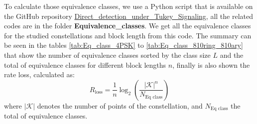 To calculate those equivalence classes, we use a Python script that is available on the GitHub repository \href{https://github.com/dfigueroa11/Direct_detection_under_Tukey_Signaling.git}{Direct\_detection\_under\_Tukey\_Signaling}, all the related codes are in the folder \textbf{Equivalence\_classes}. We get all the equivalence classes for the studied constellations and block length from this code. The summary can be seen in the tables \ref{tab:Eq_class_4PSK} to \ref{tab:Eq_class_810ring_810ary} that show the number of equivalence classes sorted by the class size $L$ and the total of equivalence classes for different block lengths $n$, finally is also shown the rate loss, calculated as:
\begin{equation}
R_\text{loss}=\frac{1}{n}\log_2\left(\frac{|\mathcal K|^n}{N_\text{Eq class}}\right)
\label{eq:rate_loss}
\end{equation}
where $|\mathcal K|$ denotes the number of points of the constellation, and $N_\text{Eq class}$ the total of equivalence classes.


